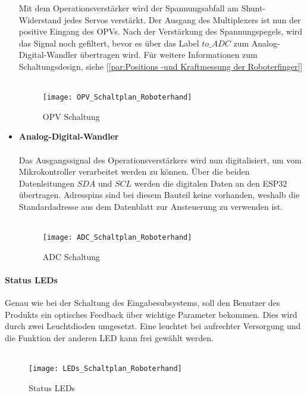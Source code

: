 \documentclass[titlepage,12pt,twoside]{article}
\begin{document}
\begin{itemize}
	Mit dem Operationsverstärker wird der Spannungsabfall am Shunt-Widerstand jedes Servos verstärkt. Der Ausgang des Multiplexers ist nun der positive Eingang des OPVs. Nach der Verstärkung des Spannungspegels, wird
	das Signal noch gefiltert, bevor es über das Label $to\_ADC$ zum Analog-Digital-Wandler übertragen wird. Für weitere Informationen zum Schaltungsdesign, siehe [\textcolor{blue}{\autoref{par:Positions -und Kraftmessung der Roboterfinger}}] \\
	\\
	\begin{figure}[H]
		\begin{center}
			\scalebox{0.6}
			{\texttt{[image: OPV\_Schaltplan\_Roboterhand]}}
			\caption{OPV Schaltung}
			\label{fig:OPV_Schaltplan_Roboterhand}		
		\end{center}
	\end{figure}
	\newpage
	\item \textbf{Analog-Digital-Wandler} \\
	\\
	Das Ausgangssignal des Operationsverstärkers wird nun digitalisiert, um vom Mikrokontroller verarbeitet werden zu können. Über die beiden Datenleitungen $SDA$ und $SCL$ werden die digitalen Daten an den ESP32 übertragen. 
	Adresspins sind bei diesem Bauteil keine vorhanden, weshalb die Standardadresse aus dem Datenblatt zur Ansteuerung zu verwenden ist. \\
	\\
	\begin{figure}[H]
		\begin{center}
			\scalebox{0.6}
			{\texttt{[image: ADC\_Schaltplan\_Roboterhand]}}
			\caption{ADC Schaltung}
			\label{fig:ADC_Schaltplan_Roboterhand}			
		\end{center}
	\end{figure}
\end{itemize}

\paragraph{Status LEDs}
\hfill \break
\hfill \break
Genau wie bei der Schaltung des Eingabesubsystems, soll den Benutzer des Produkts ein optisches Feedback über wichtige Parameter bekommen. Dies wird durch zwei Leuchtdioden umgesetzt. Eine leuchtet bei aufrechter Versorgung und die
Funktion der anderen LED kann frei gewählt werden. \\
\\
\begin{figure}[H]
	\begin{center}
		\scalebox{0.4}
		{\texttt{[image: LEDs\_Schaltplan\_Roboterhand]}}
		\caption{Status LEDs}
		\label{fig:LEDs_Schaltplan_Roboterhand}		
	\end{center}
\end{figure}
\end{document}
